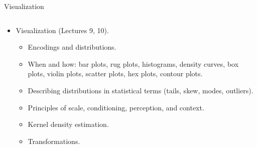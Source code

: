\documentclass[aspectratio=169]{../latex_main/tntbeamer}  %
\begin{document}
	 \begin{frame}{Visualization}
	    \begin{columns}
	      \begin{column}{.5\textwidth}
	            \begin{itemize}
	                \item Visualization (Lectures 9, 10).
	                \begin{itemize}
	                    \item Encodings and distributions.
	                    \item When and how: bar plots, rug plots, histograms, density curves, box plots, violin plots, scatter plots, hex plots, contour plots.
	                    \item Describing distributions in statistical terms (tails, skew, modes, outliers).
	                    \item Principles of scale, conditioning, perception, and context.
	                    \item Kernel density estimation.
	                    \item Transformations.
	                \end{itemize}
	            \end{itemize}
	                
	       \end{column}
	       

\end{columns}
\end{frame}
\end{document}
